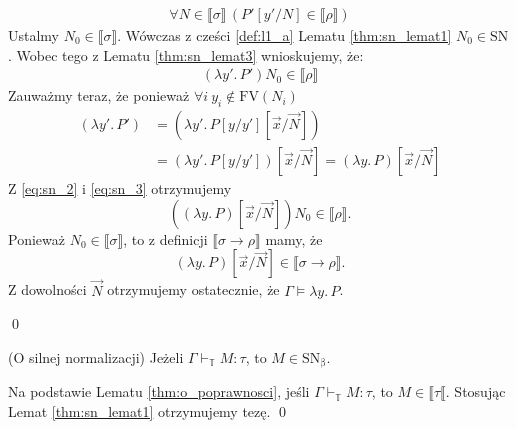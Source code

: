\begin{dowod}
\begin{enumerate}[label=(\alph*)]
      \begin{align*}
        \forall N\in\llbracket\sigma\rrbracket\, \left(
        P'[y'/N]\in\llbracket \rho \rrbracket
        \right )
      \end{align*}
      Ustalmy \(N_0\in\llbracket \sigma \rrbracket\). Wówczas z cześci \ref{def:l1_a} Lematu \ref{thm:sn_lemat1} \(N_0\in\mathrm{SN}\). Wobec tego z Lematu \ref{thm:sn_lemat3} wnioskujemy, że:
      \begin{align}
        (\lambda y'.\,P')N_0\in\llbracket \rho \rrbracket \tag{\textasteriskcentered\textasteriskcentered}\label{eq:sn_2}
      \end{align}
      Zauważmy teraz, że ponieważ \(\forall i\ y_i\not\in\mathrm{FV}(N_i) \)
      \begin{equation}
        \begin{aligned}
        (\lambda y'.\,P')&=(\lambda y'.\,P[y/y'][\vec{x}/\vec{N}])\\
                         &=(\lambda y'.\,P[y/y'])[\vec{x}/\vec{N}]
                         =(\lambda y.\,P)[\vec{x}/\vec{N}] 
        \end{aligned} \tag{\textasteriskcentered\textasteriskcentered\textasteriskcentered}\label{eq:sn_3}
      \end{equation}
      Z \eqref{eq:sn_2} i \eqref{eq:sn_3} otrzymujemy     
      \[
        \left(
          (\lambda y.\,P)[\vec{x}/\vec{N}]
        \right)
        N_0 \in \llbracket \rho \rrbracket .
      \]
      Ponieważ \(N_0\in\llbracket \sigma \rrbracket\), to z definicji \(\llbracket \sigma \to \rho \rrbracket\) mamy, że 
      \[
        (\lambda y.\,P)[\vec{x}/\vec{N}]\in\llbracket \sigma \to \rho \rrbracket.
      \]
      Z dowolności \(\vec{N}\) otrzymujemy ostatecznie, że \(\Gamma\models \lambda y.\,P\).
  \end{enumerate}
  \qed
\end{dowod}
\begin{twierdzenie}(O silnej normalizacji)
  Jeżeli \(\Gamma\vdash_\mathbb{T}M:\tau\), to \(M\in\mathrm{SN_\beta}\).
\end{twierdzenie}
\begin{dowod}
  Na podstawie Lematu \ref{thm:o_poprawnosci}, jeśli \(\Gamma\vdash_\mathbb{T} M:\tau\), to \(M\in\llbracket \tau \llbracket\). Stosując Lemat \ref{thm:sn_lemat1} otrzymujemy tezę. \qed
\end{dowod}
